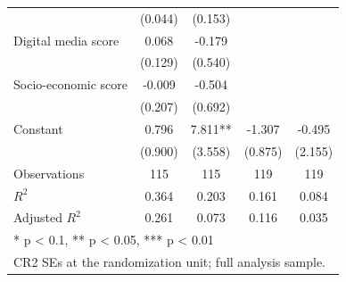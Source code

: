 \begin{table}
\begin{tabular}[t]{lcccc}
 & (0.044) & (0.153) &  & \\
Digital media score & 0.068 & -0.179 &  & \\
 & (0.129) & (0.540) &  & \\
Socio-economic score & -0.009 & -0.504 &  & \\
 & (0.207) & (0.692) &  & \\
Constant & 0.796 & 7.811** & -1.307 & -0.495\\
 & (0.900) & (3.558) & (0.875) & (2.155)\\
Observations & 115 & 115 & 119 & 119\\
$R^{2}$ & 0.364 & 0.203 & 0.161 & 0.084\\
Adjusted $R^{2}$ & 0.261 & 0.073 & 0.116 & 0.035\\
\bottomrule
\multicolumn{5}{l}{\rule{0pt}{1em}* p < 0.1, ** p < 0.05, *** p < 0.01}\\
\multicolumn{5}{l}{\rule{0pt}{1em}CR2 SEs at the randomization unit; full analysis sample.}\\
\end{tabular}
\end{table}
